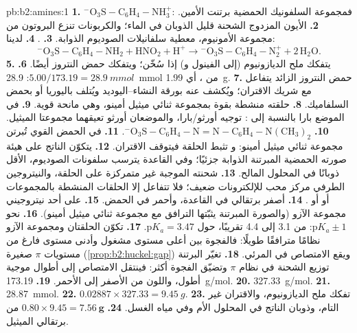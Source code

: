 \begin{solution}{pb:b2:amines:1}
\textbf{1.} $\mathrm{{}^-O_3S{-}C_6H_4{-}NH_3^+}$: فمجموعة السلفونيك الحمضية برتنت الأمين.
\textbf{2.} الأيون المزدوج الشحنة قليل الذوبان في الماء؛ والكربونات تنزع البروتون من مجموعة الأمونيوم،
معطية سلفانيلات الصوديوم الذوابة.
\textbf{3.} .
\textbf{4.} لدينا:
\[
  \mathrm{{}^-O_3S{-}C_6H_4{-}NH_2 + HNO_2 + H^+ \to {}^-O_3S{-}C_6H_4{-}N_2^+ + 2\,H_2O} .
\]
\textbf{5.} يتفكك ملح الديازونيوم (إلى الفينول و) إذا سُخّن؛ ويتفكك حمض النتروز
أيضًا.
\textbf{6.} $5.00/173.19 = \qty{28.9}{mmol}$: \qty{28.9}{mmol} من ، أي \qty{1.99}{g}.
\textbf{7.} حمض النتروز الزائد يتفاعل مع شريك الاقتران؛ ويُكشف عنه بورقة النشاء--اليوديد
ويُتلف باليوريا أو بحمض السلفاميك.
\textbf{8.} حلقته منشطة بقوة بمجموعة ثنائي ميثيل أمينو، وهي مانحة قوية.
\textbf{9.} في الموضع بارا بالنسبة إلى : توجيه أورثو/بارا، والموضعان أورثو تعيقهما
مجموعتا الميثيل.
\textbf{10.} $\mathrm{{}^-O_3S{-}C_6H_4{-}N{=}N{-}C_6H_4{-}N(CH_3)_2}$.
\textbf{11.} في الحمض القوي تُبرتن مجموعة ثنائي ميثيل أمينو: و تثبط الحلقة
فيتوقف الاقتران.
\textbf{12.} يتكوّن الناتج على هيئة صورته الحمضية المبرتنة الذوابة جزئيًا؛ وفي القاعدة يترسب
سلفونات الصوديوم، الأقل ذوبانًا في المحلول المالح.
\textbf{13.} شحنته الموجبة غير متمركزة على الحلقة، والنيتروجين الطرفي مركز محب للإلكترونات
ضعيف؛ فلا تتفاعل إلا الحلقات المنشطة بالمجموعات  أو  أو .
\textbf{14.} أصفر برتقالي في القاعدة، وأحمر في الحمض.
\textbf{15.} على أحد نيتروجيني مجموعة الآزو (والصورة المبرتنة يثبّتها الترافق مع
مجموعة ثنائي ميثيل أمينو).
\textbf{16.} نحو $\mathrm pK_a \pm 1$: من 3.1 إلى 4.4 تقريبًا، حول $\mathrm pK_a = 3.47$.
\textbf{17.} تكوّن الحلقتان ومجموعة الآزو نظامًا مترافقًا طويلًا: فالفجوة بين أعلى مستوى
مشغول وأدنى مستوى فارغ من مستويات $\pi$ صغيرة (\cref{prop:b2:huckel:gap}) ويقع الامتصاص
في المرئي.
\textbf{18.} تغيّر البرتنة توزيع الشحنة في نظام $\pi$ وتضيّق الفجوة
أكثر: فينتقل الامتصاص إلى أطوال موجية أطول، واللون من الأصفر إلى الأحمر.
\textbf{19.} \qty{173.19}{g/mol}.
\textbf{20.} \qty{327.33}{g/mol}.
\textbf{21.} \qty{28.87}{mmol}.
\textbf{22.} $0.02887 \times 327.33 = \qty{9.45}{g}$.
\textbf{23.} تفكك ملح الديازونيوم، والاقتران غير التام، وذوبان الناتج في
المحلول الأم وفي مياه الغسل.
\textbf{24.} $0.80 \times 9.45 = \boldsymbol{\qty{7.56}{g}}$ من برتقالي الميثيل.
\end{solution}
